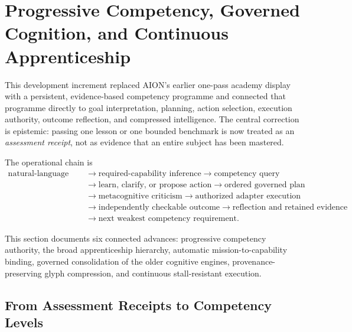 
\section{Progressive Competency, Governed Cognition, and Continuous Apprenticeship}
\label{sec:aion-progressive-governed-apprenticeship}

This development increment replaced AION's earlier one-pass academy display
with a persistent, evidence-based competency programme and connected that
programme directly to goal interpretation, planning, action selection,
execution authority, outcome reflection, and compressed intelligence.  The
central correction is epistemic: passing one lesson or one bounded benchmark
is now treated as an \emph{assessment receipt}, not as evidence that an entire
subject has been mastered.

The operational chain is
\begin{equation}
\begin{aligned}
\text{natural-language mission}
&\rightarrow \text{required-capability inference}
\rightarrow \text{competency query} \\
&\rightarrow \text{learn, clarify, or propose action}
\rightarrow \text{ordered governed plan} \\
&\rightarrow \text{metacognitive criticism}
\rightarrow \text{authorized adapter execution} \\
&\rightarrow \text{independently checkable outcome}
\rightarrow \text{reflection and retained evidence} \\
&\rightarrow \text{next weakest competency requirement}.
\end{aligned}
\label{eq:aion-progressive-loop}
\end{equation}

This section documents six connected advances: progressive competency
authority, the broad apprenticeship hierarchy, automatic mission-to-capability
binding, governed consolidation of the older cognitive engines, provenance-
preserving glyph compression, and continuous stall-resistant execution.

\subsection{From Assessment Receipts to Competency Levels}
\label{subsec:aion-progressive-levels}

